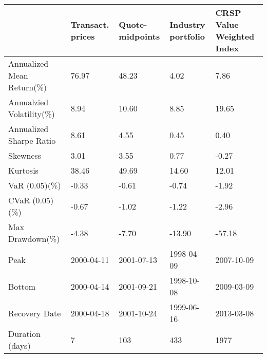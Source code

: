 \begin{tabular}{lllll}
\toprule
 & Transact. prices & Quote-midpoints & Industry portfolio & CRSP Value Weighted Index \\
\midrule
Annualized Mean Return(\%) & 76.97 & 48.23 & 4.02 & 7.86 \\
Annualzied Volatility(\%) & 8.94 & 10.60 & 8.85 & 19.65 \\
Annualized Sharpe Ratio & 8.61 & 4.55 & 0.45 & 0.40 \\
Skewness & 3.01 & 3.55 & 0.77 & -0.27 \\
Kurtosis & 38.46 & 49.69 & 14.60 & 12.01 \\
VaR (0.05)(\%) & -0.33 & -0.61 & -0.74 & -1.92 \\
CVaR (0.05)(\%) & -0.67 & -1.02 & -1.22 & -2.96 \\
Max Drawdown(\%) & -4.38 & -7.70 & -13.90 & -57.18 \\
Peak & 2000-04-11 & 2001-07-13 & 1998-04-09 & 2007-10-09 \\
Bottom & 2000-04-14 & 2001-09-21 & 1998-10-08 & 2009-03-09 \\
Recovery Date & 2000-04-18 & 2001-10-24 & 1999-06-16 & 2013-03-08 \\
Duration (days) & 7 & 103 & 433 & 1977 \\
\bottomrule
\end{tabular}
